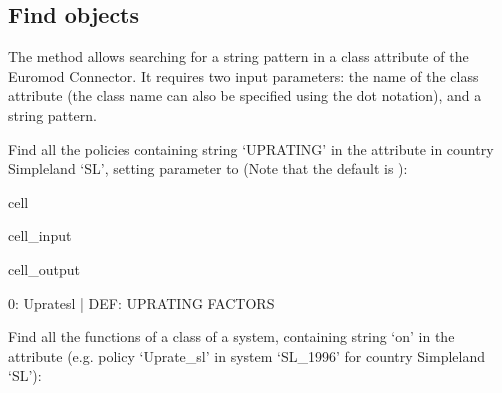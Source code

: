\documentclass[letterpaper,10pt,english]{sphinxmanual}
\begin{document}
\subsection{Find objects}
\label{\detokenize{notebooks/userguide:find-objects}}
\sphinxAtStartPar
The method  allows searching for a string pattern in a class attribute of the Euromod Connector. It requires two input parameters: the name of the class attribute (the class name can also be specified using the dot notation), and a string pattern.

\sphinxAtStartPar
Find all the policies containing string ‘UPRATING’ in the attribute  in country Simpleland ‘SL’, setting parameter  to  (Note that the default is ):

\begin{sphinxuseclass}{cell}
\begin{sphinxuseclass}{cell_input}
\begin{sphinxVerbatim}[commandchars=\\\{\}]
\PYG{p}{[}\PYG{p}{]}
\end{sphinxVerbatim}

\end{sphinxuseclass}
\begin{sphinxuseclass}{cell_output}
\begin{sphinxVerbatim}[commandchars=\\\{\}]
0: Uprate\PYGZus{}sl    |    DEF: UPRATING FACTORS 
\end{sphinxVerbatim}

\end{sphinxuseclass}
\end{sphinxuseclass}
\sphinxAtStartPar
Find all the functions of a  class of a system, containing string ‘on’ in the  attribute (e.g. policy ‘Uprate\_sl’ in system ‘SL\_1996’ for country Simpleland ‘SL’):
\end{document}
